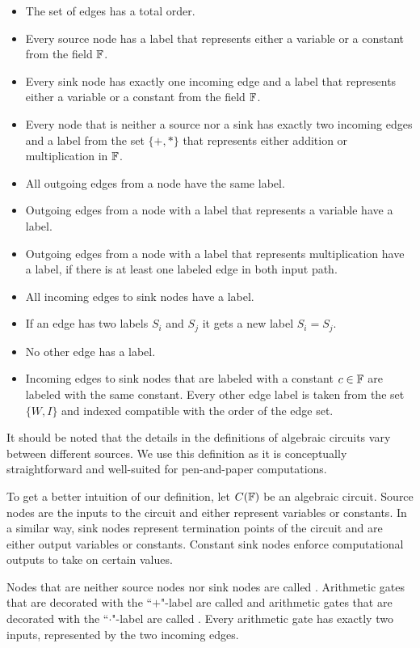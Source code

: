 \begin{definition}{}\label{def:algebraic-circuit}
\begin{itemize}
\item The set of edges has a total order.  
\item Every source node has a label that represents either a variable or a constant from the field $\mathbb{F}$.
\item Every sink node has exactly one incoming edge and a label that represents either a variable or a constant from the field $\mathbb{F}$.
\item Every node that is neither a source nor a sink has exactly two incoming edges and a label from the set $\{+,*\}$ that represents either addition or multiplication in $\mathbb{F}$.
\item All outgoing edges from a node have the same label.
\item Outgoing edges from a node with a label that represents a variable have a label.
\item Outgoing edges from a node with a label that represents multiplication have a label, if there is at least one labeled edge in both input path.
\item All incoming edges to sink nodes have a label.
\item If an edge has two labels $S_i$ and $S_j$ it gets a new label $S_i = S_j$.
\item No other edge has a label.
\item Incoming edges to sink nodes that are labeled with a constant $c\in\mathbb{F}$ are labeled with the same constant. Every other edge label is taken from the set $\{W,I\}$ and indexed compatible with the order of the edge set. 
\end{itemize} 
\end{definition}
It should be noted that the details in the definitions of algebraic circuits vary between different sources. We use this definition as it is conceptually straightforward and well-suited for pen-and-paper computations.

To get a better intuition of our definition, let $C(\mathbb{F})$ be an algebraic circuit. Source nodes are the inputs to the circuit and either represent variables or constants. In a similar way, sink nodes represent termination points of the circuit and are either output variables or constants. Constant sink nodes enforce computational outputs to take on certain values.  

Nodes that are neither source nodes nor sink nodes are called . Arithmetic gates that are decorated with the ``$+$"-label are called  and arithmetic gates that are decorated with the ``$\cdot$"-label are called . Every arithmetic gate has exactly two inputs, represented by the two incoming edges.

